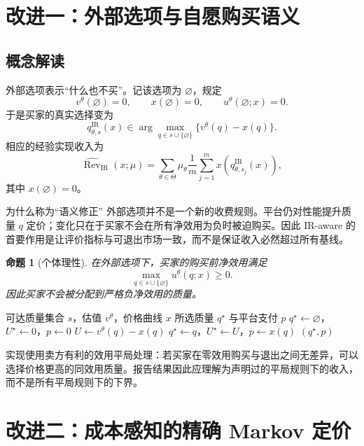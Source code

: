 \documentclass[11pt,a4paper]{ctexart}
\newtheorem{proposition}{命题}[section]
\newcommand{\Types}{\Theta}
\newcommand{\Rev}{\operatorname{Rev}}
\begin{document}
\section{改进一：外部选项与自愿购买语义}

\subsection{概念解读}

外部选项表示“什么也不买”。记该选项为 $\varnothing$，规定
\[
v^\theta(\varnothing)=0,\qquad x(\varnothing)=0,\qquad
u^\theta(\varnothing;x)=0.
\]
于是买家的真实选择变为
\[
q_{\theta,s}^{\mathrm{IR}}(x)
\in\arg\max_{q\in s\cup\{\varnothing\}}
\{v^\theta(q)-x(q)\}.
\]
相应的经验实现收入为
\[
\widehat{\Rev}_{\mathrm{IR}}(x;\mu)
=\sum_{\theta\in\Types}\mu_\theta\frac1m\sum_{j=1}^{m}
x\!\left(q_{\theta,s_j}^{\mathrm{IR}}(x)\right),
\]
其中 $x(\varnothing)=0$。

\begin{conceptbox}{为什么称为“语义修正”}
外部选项并不是一个新的收费规则。平台仍对性能提升质量 $q$ 定价；变化只在于买家不会在所有净效用为负时被迫购买。因此 IR-aware 的首要作用是让评价指标与可退出市场一致，而不是保证收入必然超过所有基线。
\end{conceptbox}

\begin{proposition}[个体理性]
在外部选项下，买家的购买前净效用满足
\[
\max_{q\in s\cup\{\varnothing\}}u^\theta(q;x)\ge0.
\]
因此买家不会被分配到严格负净效用的质量。
\end{proposition}

\begin{algorithm}[H]
\caption{带外部选项的买家响应与支付}
\begin{algorithmic}[1]
\Require 可达质量集合 $s$，估值 $v^\theta$，价格曲线 $x$
\Ensure 所选质量 $q^\star$ 与平台支付 $p$
\State $q^\star\gets\varnothing$，$U^\star\gets0$，$p\gets0$
  \State $U\gets v^\theta(q)-x(q)$
    \State $q^\star\gets q$，$U^\star\gets U$，$p\gets x(q)$
  \EndIf
\EndFor
\State \Return $(q^\star,p)$
\end{algorithmic}
\end{algorithm}

实现使用卖方有利的效用平局处理：若买家在零效用购买与退出之间无差异，可以选择价格更高的同效用质量。报告结果因此应理解为声明过的平局规则下的收入，而不是所有平局规则下的下界。

\section{改进二：成本感知的精确 Markov 定价}
\end{document}
